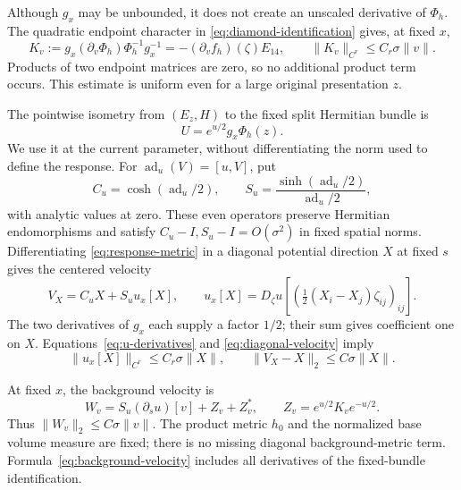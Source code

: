 \documentclass[11pt]{amsart}
\theoremstyle{definition}
\theoremstyle{remark}
\newcommand{\ad}{\operatorname{ad}}
\begin{document}
Although $g_x$ may be unbounded, it does not create an unscaled derivative
of $\Phi_h$. The quadratic endpoint character in
\eqref{eq:diamond-identification} gives, at fixed $x$,
\begin{equation}\label{eq:phi-derivative}
 K_v:=g_x(\partial_v\Phi_h)\Phi_h^{-1}g_x^{-1}
       =-(\partial_vf_h)(\zeta)E_{14},\qquad
 \|K_v\|_{C^r}\le C_r\sigma\|v\|.
\end{equation}
Products of two endpoint matrices are zero, so no additional product term
occurs. This estimate is uniform even for a large original presentation $z$.

The pointwise isometry from $(E_z,H)$ to the fixed split Hermitian bundle
is
\[
 U=e^{u/2}g_x\Phi_h(z).
\]
We use it at the current parameter, without differentiating the norm used
to define the response. For $\ad_u(V)=[u,V]$, put
\begin{equation}\label{eq:even-metric-operators}
 C_u=\cosh(\ad_u/2),\qquad
 S_u=\frac{\sinh(\ad_u/2)}{\ad_u/2},
\end{equation}
with analytic values at zero. These even operators preserve Hermitian
endomorphisms and satisfy $C_u-I,S_u-I=O(\sigma^2)$ in fixed spatial
norms. Differentiating \eqref{eq:response-metric} in a diagonal potential
direction $X$ at fixed $s$ gives the centered velocity
\begin{equation}\label{eq:diagonal-velocity}
 V_X=C_uX+S_u u_x[X],\qquad
 u_x[X]=D_\zeta u\left[\left(\tfrac12(X_i-X_j)\zeta_{ij}\right)_{ij}\right].
\end{equation}
The two derivatives of $g_x$ each supply a factor $1/2$; their sum gives
coefficient one on $X$. Equations~\eqref{eq:u-derivatives} and
\eqref{eq:diagonal-velocity} imply
\begin{equation}\label{eq:diagonal-velocity-bound}
 \|u_x[X]\|_{C^r}\le C_r\sigma\|X\|,
 \qquad \|V_X-X\|_2\le C\sigma\|X\|.
\end{equation}

At fixed $x$, the background velocity is
\begin{equation}\label{eq:background-velocity}
 W_v=S_u(\partial_su)[v]+Z_v+Z_v^*,\qquad
 Z_v=e^{u/2}K_ve^{-u/2}.
\end{equation}
Thus $\|W_v\|_2\le C\sigma\|v\|$. The product metric $h_0$ and
the normalized base volume measure are fixed; there is no missing diagonal
background-metric term. Formula~\eqref{eq:background-velocity} includes
all derivatives of the fixed-bundle identification.
\end{document}
